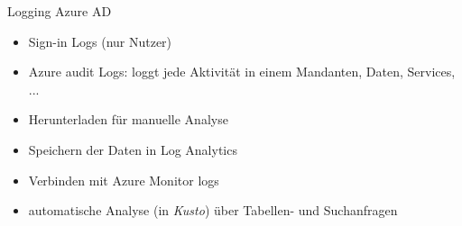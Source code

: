 \begin{flashcard}[Definition]{Logging Azure AD}
  \begin{itemize}
    \item Sign-in Logs (nur Nutzer)
    \item Azure audit Logs: \newline
      loggt jede Aktivität in einem Mandanten, Daten, Services, ...
    \item Herunterladen für manuelle Analyse
    \item Speichern der Daten in Log Analytics
    \item Verbinden mit Azure Monitor logs
    \item automatische Analyse (in \emph{Kusto}) über Tabellen- und Suchanfragen
  \end{itemize}
\end{flashcard}
